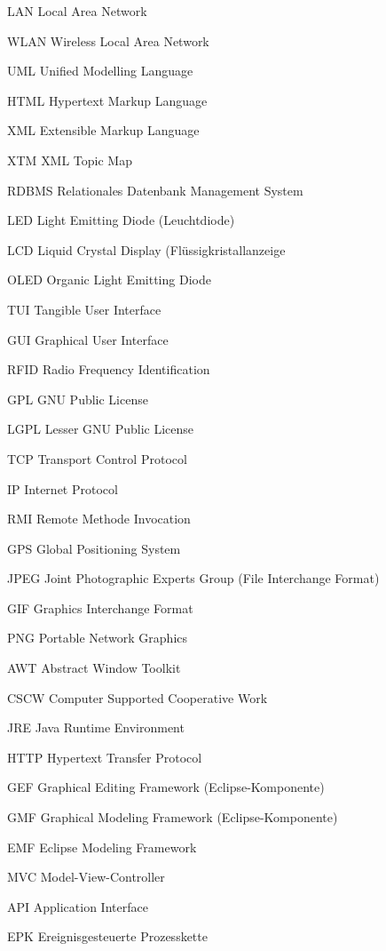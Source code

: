 {LAN}
{Local Area Network}

{WLAN}
{Wireless Local Area Network}

{UML}
{Unified Modelling Language}

{HTML}
{Hypertext Markup Language}

{XML}
{Extensible Markup Language}

{XTM}
{XML Topic Map}

{RDBMS}
{Relationales Datenbank Management System}


{LED}
{Light Emitting Diode (Leuchtdiode)}

{LCD}
{Liquid Crystal Display (Flüssigkristallanzeige}

{OLED}
{Organic Light Emitting Diode}

{TUI}
{Tangible User Interface}

{GUI}
{Graphical User Interface}

{RFID}
{Radio Frequency Identification}

{GPL}
{GNU Public License}

{LGPL}
{Lesser GNU Public License}

{TCP}
{Transport Control Protocol}

{IP}
{Internet Protocol}

{RMI}
{Remote Methode Invocation}

{GPS}
{Global Positioning System}

{JPEG}
{Joint Photographic Experts Group (File Interchange Format)}

{GIF}
{Graphics Interchange Format}

{PNG}
{Portable Network Graphics}

{AWT}
{Abstract Window Toolkit}

{CSCW}
{Computer Supported Cooperative Work}

{JRE}
{Java Runtime Environment}

{HTTP}
{Hypertext Transfer Protocol}

{GEF}
{Graphical Editing Framework (Eclipse-Komponente)}

{GMF}
{Graphical Modeling Framework (Eclipse-Komponente)}

{EMF}
{Eclipse Modeling Framework}

{MVC}
{Model-View-Controller}

{API}
{Application Interface}

{EPK}
{Ereignisgesteuerte Prozesskette}
